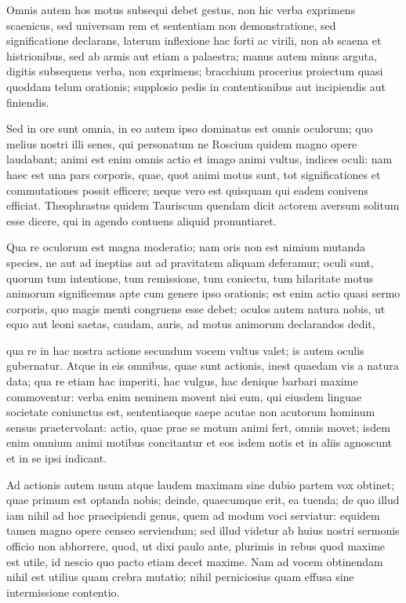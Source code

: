  Omnis autem hos motus subsequi debet gestus, non hic verba exprimens scaenicus, sed universam rem et sententiam non demonstratione, sed significatione declarans, laterum inflexione hac forti ac virili, non ab scaena et histrionibus, sed ab armis aut etiam a palaestra; manus autem minus arguta, digitis subsequens verba, non exprimens; bracchium procerius proiectum quasi quoddam telum orationis; supplosio pedis in contentionibus aut incipiendis aut finiendis.

 Sed in ore sunt omnia, in eo autem ipso dominatus est omnis oculorum; quo melius nostri illi senes, qui personatum ne Roscium quidem magno opere laudabant; animi est enim omnis actio et imago animi vultus, indices oculi: nam haec est una pars corporis, quae, quot animi motus sunt, tot significationes et commutationes possit efficere; neque vero est quisquam qui eadem conivens efficiat. Theophrastus quidem Tauriscum quendam dicit actorem aversum solitum esse dicere, qui in agendo contuens aliquid pronuntiaret.

 Qua re oculorum est magna moderatio; nam oris non est nimium mutanda species, ne aut ad ineptias aut ad pravitatem aliquam deferamur; oculi sunt, quorum tum intentione, tum remissione, tum coniectu, tum hilaritate motus animorum significemus apte cum genere ipso orationis; est enim actio quasi sermo corporis, quo magis menti congruens esse debet; oculos autem natura nobis, ut equo aut leoni saetas, caudam, auris, ad motus animorum declarandos dedit,

 qua re in hac nostra actione secundum vocem vultus valet; is autem oculis gubernatur. Atque in eis omnibus, quae sunt actionis, inest quaedam vis a natura data; qua re etiam hac imperiti, hac vulgus, hac denique barbari maxime commoventur: verba enim neminem movent nisi eum, qui eiusdem linguae societate coniunctus est, sententiaeque saepe acutae non acutorum hominum sensus praetervolant: actio, quae prae se motum animi fert, omnis movet; isdem enim omnium animi motibus concitantur et eos isdem notis et in aliis agnoscunt et in se ipsi indicant.

 Ad actionis autem usum atque laudem maximam sine dubio partem vox obtinet; quae primum est optanda nobis; deinde, quaecumque erit, ea tuenda; de quo illud iam nihil ad hoc praecipiendi genus, quem ad modum voci serviatur: equidem tamen magno opere censeo serviendum; sed illud videtur ab huius nostri sermonis officio non abhorrere, quod, ut dixi paulo ante, plurimis in rebus quod maxime est utile, id nescio quo pacto etiam decet maxime. Nam ad vocem obtinendam nihil est utilius quam crebra mutatio; nihil perniciosius quam effusa sine intermissione contentio.

